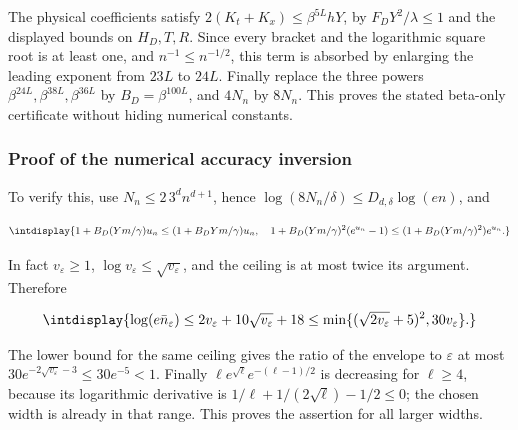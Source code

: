 
The physical coefficients satisfy \(2(K_t+K_x)\le\beta^{5L}hY\), by \(F_DY^2/\lambda\le1\) and the displayed bounds on \(H_D,\allowbreak T,\allowbreak R\). Since every bracket and the logarithmic square root is at least one, and \(n^{-1}\le n^{-1/2}\), this term is absorbed by enlarging the leading exponent from \(23L\) to \(24L\). Finally replace the three powers \(\beta^{24L},\allowbreak \beta^{38L},\allowbreak \beta^{36L}\) by \(B_D=\beta^{100L}\), and \(4N_n\) by \(8N_n\). This proves the stated beta-only certificate without hiding numerical constants.


\subsubsection{Proof of the numerical accuracy inversion}



To verify this, use \(N_n\le2\,\allowbreak 3^dn^{d+1}\), hence \(\log(8N_n/\delta)\le D_{d,\allowbreak \delta}\log(en)\), and


\begingroup\renewcommand{\theHequation}{intdisplay.480}
\begin{equation*}
\intdisplay{
1+B_D(Ym/\gamma)u_n\le(1+B_DYm/\gamma)u_n,
\quad
1+B_D(Ym/\gamma)^2(e^{u_n}-1)
\le(1+B_D(Ym/\gamma)^2)e^{u_n}.
}
\end{equation*}
\endgroup


In fact \(v_\varepsilon\ge1\), \(\log v_\varepsilon\le\sqrt{v_\varepsilon}\), and the ceiling is at most twice its argument. Therefore


\begingroup\renewcommand{\theHequation}{intdisplay.481}
\begin{equation*}
\intdisplay{
\log(e\bar n_\varepsilon)
\le2v_\varepsilon+10\sqrt{v_\varepsilon}+18
\le\min\{(\sqrt{2v_\varepsilon}+5)^2,30v_\varepsilon\}.
}
\end{equation*}
\endgroup


The lower bound for the same ceiling gives the ratio of the envelope to \(\varepsilon\) at most \(30e^{-2\sqrt{v_\varepsilon}-3}\le30e^{-5}<1\). Finally \(\ell e^{\sqrt\ell}e^{-(\ell-1)/2}\) is decreasing for \(\ell\ge4\), because its logarithmic derivative is \(1/\ell+1/(2\sqrt\ell)-1/2\le0\); the chosen width is already in that range. This proves the assertion for all larger widths.


